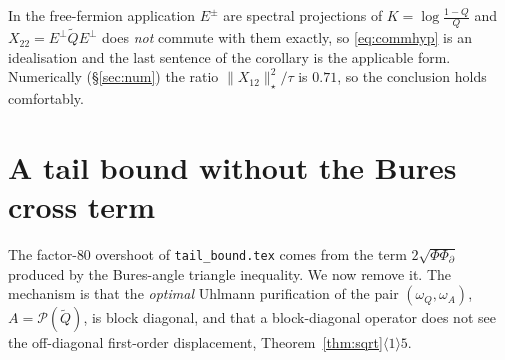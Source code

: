 \documentclass[11pt]{article}
\newcommand{\Nst}[1]{\lVert #1\rVert_{\star}}\newcommand{\Nsto}[1]{\lVert #1\rVert_{\star\star}}\newcommand{\Pinch}{\mathcal P}
\begin{document}
\begin{remark}[status]
In the free-fermion application $E^\pm$ are spectral projections of $K=\log\frac{1-Q}Q$ and
$X_{22}=E^\perp\widetilde QE^\perp$ does \emph{not} commute with them exactly, so
\eqref{eq:commhyp} is an idealisation and the last sentence of the corollary is the applicable form.
Numerically (\S\ref{sec:num}) the ratio $\Nst{X_{12}}^2/\tau$ is $0.71$, so the conclusion holds
comfortably.
\end{remark}

\section{A tail bound without the Bures cross term}\label{sec:nocross}

The factor-$80$ overshoot of \texttt{tail\_bound.tex} comes from the term $2\sqrt{\Phi\Phi_\partial}$
produced by the Bures-angle triangle inequality.  We now remove it.  The mechanism is that the
\emph{optimal} Uhlmann purification of the pair $(\omega_Q,\omega_A)$, $A=\Pinch(\widetilde Q)$, is
block diagonal, and that a block-diagonal operator does not see the off-diagonal first-order
displacement, Theorem~\ref{thm:sqrt}$\langle1\rangle5$.
\end{document}
